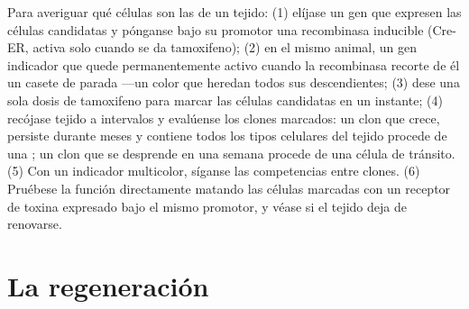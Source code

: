 \begin{method}\label{met:b3:stem-cells:tracing}
Para averiguar qué células son las  de un tejido: (1)
elíjase un gen que expresen las células candidatas y pónganse bajo su
promotor una recombinasa inducible (Cre-ER, activa solo cuando se da
tamoxifeno); (2) en el mismo animal, un gen indicador que quede
permanentemente activo cuando la recombinasa recorte de él un casete de
parada ---un color que heredan todos sus descendientes; (3) dese una
sola dosis de tamoxifeno para marcar las células candidatas en un
instante; (4) recójase tejido a intervalos y evalúense los clones
marcados: un clon que crece, persiste durante meses y contiene todos
los tipos celulares del tejido procede de una ; un clon que
se desprende en una semana procede de una célula de tránsito. (5) Con
un indicador multicolor, síganse las competencias entre clones. (6)
Pruébese la función directamente matando las células marcadas con un
receptor de toxina expresado bajo el mismo promotor, y véase si el
tejido deja de renovarse.
\end{method}

\section{La regeneración}


